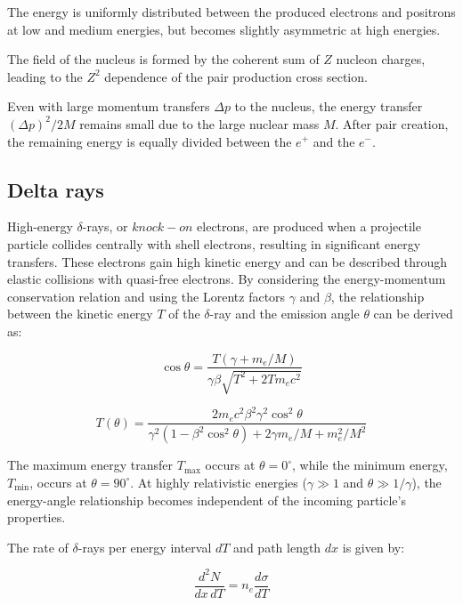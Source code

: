 The energy is uniformly distributed between the produced 
electrons and positrons at low and medium energies, but becomes 
slightly asymmetric at high energies.

The field of the nucleus is formed by the coherent sum of $Z$ 
nucleon charges, leading to the $Z^2$ dependence of the pair 
production cross section.

Even with large momentum transfers $\Delta p$ to the nucleus, 
the energy transfer $(\Delta p)^2/2M$ remains small due to the 
large nuclear mass $M$. After pair creation, the remaining 
energy is equally divided between the $e^+$ and the $e^-$.

\subsection{Delta rays}
High-energy $\delta$-rays, or $knock-on$ electrons, 
are produced when a projectile particle collides 
centrally with shell electrons, resulting in 
significant energy transfers.
These electrons 
gain high kinetic energy and can be described 
through elastic collisions with quasi-free electrons. 
By considering the energy-momentum conservation relation 
and using the Lorentz factors $\gamma$ and $\beta$, the 
relationship between the kinetic energy $T$ of the 
$\delta$-ray and the emission angle $\theta$ can be derived as:

\begin{equation}
\cos \theta = \frac{T(\gamma + m_e / M)}{\gamma \beta \sqrt{T^2 + 2T m_e c^2}}
\end{equation}

\begin{equation}
T(\theta) = \frac{2 m_e c^2 \beta^2 \gamma^2 \cos^2 \theta}{\gamma^2(1 - \beta^2 \cos^2 \theta) + 2 \gamma m_e / M + m_e^2 / M^2}
\end{equation}

The maximum energy transfer $T_{\text{max}}$ occurs at $\theta = 0^\circ$, 
while the minimum energy, $T_{\text{min}}$, occurs at $\theta = 90^\circ$. 
At highly relativistic energies ($\gamma \gg 1$ and $\theta \gg 1/\gamma$), 
the energy-angle relationship becomes independent of the incoming particle's properties.

The rate of $\delta$-rays per energy interval $dT$ and path length $dx$ is given by:

\begin{equation}
\frac{d^2 N}{dx \, dT} = n_e \frac{d\sigma}{dT}
\end{equation}

